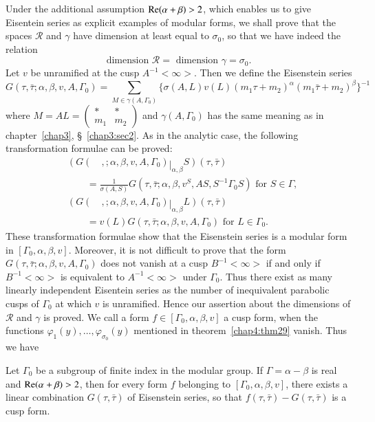 Under the additional assumption $\operatorname{Re}(\alpha+\beta)>2$, which enables
us to give Eisentein series as explicit examples of modular forms, we
shall prove that the spaces $\mathscr{R}$ and $\gamma$ have dimension
at least equal to $\sigma_0$, so that we have indeed the relation
$$
\text{dimension } \mathscr{R} = \text{ dimension } \gamma =\sigma_0.
$$
Let $v$ be unramified at the cusp $A^{-1}<\infty>$. Then we define the
Eisenstein series
$$
G(\tau,\bar{\tau}; \alpha, \beta, v, A, \Gamma_0) = \sum_{M\in
\gamma(A,\Gamma_0)} \{\sigma(A,L) v(L)
(m_1\tau+m_2)^{\alpha}(m_1\bar{\tau}+m_2)^{\beta}\}^{-1}
$$
where \pageoriginale $M=AL=\left(\begin{smallmatrix}
\ast&\ast\\m_1&m_2 \end{smallmatrix}\right)$ and
$\gamma(A,\Gamma_0)$ has the same meaning as in chapter~\ref{chap3}, 
\S~\ref{chap3:sec2}. As in the analytic case, the following transformation 
formulae can be proved:
\begin{align*}
&(G(\quad,; \alpha, \beta, v, A, \Gamma_0)\mathop{|}_{\alpha,\beta}S)
  (\tau,\bar{\tau})\\
&\qquad = \frac{1}{\sigma(A,S)} G(\tau,\bar{\tau};
  \alpha, \beta, v^S, A S, S^{-1}\Gamma_0S) \text{ for } S
  \in \Gamma,\\
&(G(\quad, ; \alpha, \beta, v, A, \Gamma_0) \mathop{|}_{\alpha,\beta}L)
  (\tau,\bar{\tau})\\ 
&\qquad = v(L)
  G(\tau,\bar{\tau};\alpha,\beta,v,A,\Gamma_0) \text{ for } L
  \in \Gamma_0.
\end{align*}
These transformation formulae show that the Eisenstein series is a
modular form in $[\Gamma_0,\alpha,\beta,v]$. Moreover, it is not
difficult to prove that the form $G(\tau,\bar{\tau};\alpha,
\beta,v,A,\Gamma_0)$ does not vanish at a cusp $B^{-1}<\infty>$ if and
only if $B^{-1}<\infty>$ is equivalent to $A^{-1}<\infty>$ under
$\Gamma_0$. Thus there exist as many linearly independent Eisentein
series as the number of inequivalent parabolic cusps of $\Gamma_0$ at
which $v$ is unramified. Hence our assertion about the dimensions of
$\mathscr{R}$ and $\gamma$ is proved. We call a form
$f\in[\Gamma_0, \alpha, \beta, v]$ a cusp form, when the
functions $\varphi_1(y),\ldots, \varphi_{\sigma_{0}}(y)$ mentioned in
theorem~\ref{chap4:thm29} vanish. Thus we have 

\begin{thm}\label{chap4:thm30}
Let $\Gamma_0$ be a subgroup of finite index in the modular group. If
$\Gamma=\alpha-\beta$ is real and $\operatorname{Re}(\alpha+\beta)>2$, then for
every form $f$ belonging to $[\Gamma_0, \alpha, \beta,v]$, there
exists a linear combination $G(\tau,\bar{\tau})$ of Eisenstein series,
so that $f(\tau,\bar{\tau})-G(\tau,\bar{\tau})$ is a cusp form.
\end{thm}


